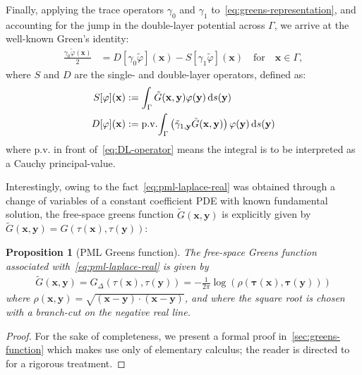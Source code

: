 \documentclass[11pt]{article}
\newcommand{\bx}{\mathbf{x}}
\newcommand{\btau}{\mathbf{\tau}}
\newcommand{\by}{\mathbf{y}}
\newcommand{\de}{\,\mathrm{d}}
\newcommand{\tvarphi}{\tilde \varphi}
\newtheorem{proposition}[theorem]{Proposition}
\begin{document}
Finally, applying the trace operators $\gamma_0$ and $\gamma_1$
to~\cref{eq:greens-representation}, and accounting for the jump in the
double-layer potential across $\Gamma$, we arrive at the well-known Green's
identity:
\begin{align}
  \label{eq:greens-formula}
  \frac{\gamma_0 \tvarphi(\bx)}{2} &=  D[\gamma_0 \tvarphi](\bx) - S[{\gamma}_1 \tvarphi](\bx) \quad \mbox{for} \quad \bx \in \Gamma,
\end{align}
where $S$ and $D$ are the single- and double-layer operators,
defined as:
\begin{subequations}
  \label{eq:calderon-operators}
  \begin{align}
  \label{eq:SL-operator}  
  S[\varphi](\bx) &:= \int_\Gamma \tilde{G}(\bx,\by) \varphi(\by) \de s(\by)\\
  \label{eq:DL-operator}  
  D[\varphi](\bx) &:= {\rm p.v.}\! \int_\Gamma\left(\tilde{\gamma}_{1,\by}\tilde{G}(\bx,\by)\right)
  \varphi(\by) \de s(\by)
\end{align}\label{eq:BIOS}\end{subequations}
where p.v. in front of~\cref{eq:DL-operator} means the integral is to be
interpreted as a Cauchy principal-value.

Interestingly, owing to the fact~\cref{eq:pml-laplace-real} was obtained through
a change of variables of a constant coefficient PDE with known fundamental
solution, the free-space greens function $\tilde{G}(\bx,\by)$ is explicitly
given by $\tilde{G}(\bx,\by) = G(\tau(\bx),\tau(\by))$:
\begin{proposition}[PML Greens function]
  The free-space Greens function associated with~\cref{eq:pml-laplace-real} is
  given by
  \begin{align}
    \label{eq:complex-Green-function}
  \tilde{G}(\bx,\by) = G_{\Delta}(\tau(\bx),\tau(\by)) = -\frac{1}{2\pi}\log(\rho(\btau(\bx),\btau(\by)))
  \end{align}
  where $\rho(\bx,\by) = \sqrt{(\bx-\by)\cdot(\bx-\by)}$, and where the square
  root is chosen with a branch-cut on the negative real line.
\end{proposition}
\begin{proof}
  For the sake of completeness, we present a formal proof
  in~\cref{sec:greens-function} which makes use only of elementary calculus; the
  reader is directed to \cite{kim2010analysis} for a rigorous treatment. 
\end{proof}
\end{document}
